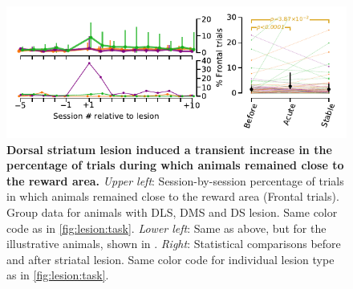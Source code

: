 \begin{figure}[h!]
	\begin{center}
		\includegraphics[scale=1]{ch-appendicies/figures/FrontalTrials.pdf}
		\caption[Frontal Trials After Striatal Lesion]
		{\textbf{Dorsal striatum lesion induced a transient increase in the percentage of trials during which animals remained close to the reward area.}
		\textit{Upper left}: Session-by-session percentage of trials in which animals remained close to the reward area (Frontal trials).
		Group data for animals with DLS, DMS and DS lesion.
		Same color code as in \autoref{fig:lesion:task}.
		\textit{Lower left}: Same as above, but for the illustrative animals, shown in .
		\textit{Right}: Statistical comparisons before and after striatal lesion.
		Same color code for individual lesion type as in \autoref{fig:lesion:task}.
		}
		\label{fig:appendix:Frontal}
	\end{center}
\end{figure}